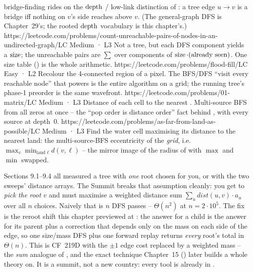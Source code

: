 \begin{mixedset}
{    bridge-finding rides on the $\operatorname{depth}$ / low-link distinction of : a tree edge
    $u\!\to\!v$ is a bridge iff nothing on $v$'s side reaches above $v$. (The general-graph DFS is
    Chapter~29's; the rooted $\operatorname{depth}$ vocabulary is this chapter's.)}
    {https://leetcode.com/problems/count-unreachable-pairs-of-nodes-in-an-undirected-graph/}{LC Medium · L3}
    {Not a tree, but each DFS component yields a $\operatorname{size}$; the unreachable pairs are $\sum$ over components
    of $\operatorname{size}\cdot(\text{already seen})$. One size table () is the whole arithmetic.}
    {https://leetcode.com/problems/flood-fill/}{LC Easy · L2}
    {Recolour the 4-connected region of a pixel. The BFS/DFS ``visit every reachable node'' that powers
     is the entire algorithm on a grid; the running tree's phase-1 preorder is the
    same wavefront.}
    {https://leetcode.com/problems/01-matrix/}{LC Medium · L3}
    {Distance of each cell to the nearest . Multi-source BFS from all zeros at once -- the
    ``pop order is distance order'' fact behind , with every source at depth~0.}
    {https://leetcode.com/problems/as-far-from-land-as-possible/}{LC Medium · L3}
    {Find the water cell maximising its distance to the nearest land: the multi-source-BFS eccentricity
    of the \emph{grid}, i.e.\ $\max_v \min_{\text{land } \ell} d(v,\ell)$ -- the mirror image of the
    radius of  with $\max$ and $\min$ swapped.}
\end{mixedset}


\begin{notebox}
Sections 9.1--9.4 all measured a tree with \emph{one} root chosen for you, or with the two
sweeps' distance arrays. The Summit breaks that assumption cleanly: you get to \emph{pick the
root} $v$ and must maximise a weighted distance sum $\sum_u \mathit{dist}(u,v)\cdot a_u$ over
all $n$ choices. Naively that is $n$ DFS passes -- $\Theta(n^2)$ at $n=2\cdot10^{5}$. The fix
is the reroot shift this chapter previewed at : the answer for a child is
the answer for its parent plus a correction that depends only on the mass on each side of the
edge, so one size/mass DFS plus one forward replay returns \emph{every} root's total in
$\Theta(n)$. This is CF~219D with the $\pm1$ edge cost replaced by a weighted mass -- the
\emph{sum} analogue of , and the exact technique Chapter~15 ()
later builds a whole theory on. It is a summit, not a new country: every tool is already in
.
\end{notebox}


